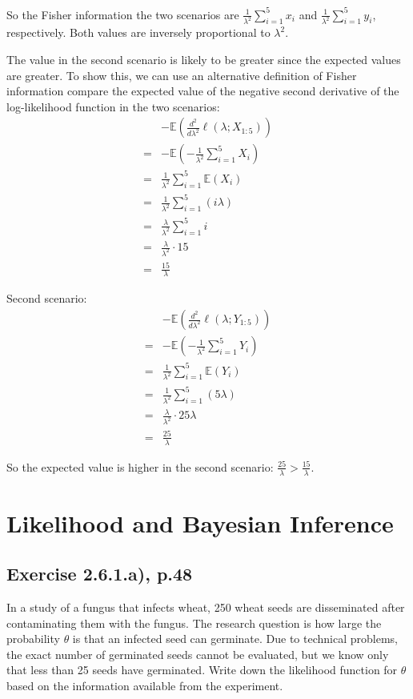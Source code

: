 \documentclass{article}
\begin{document}
\begin{ssolution}
So the Fisher information the two scenarios are
\(\frac{1}{\lambda^2}\sum_{i=1}^5 x_i\)
and
\(\frac{1}{\lambda^2}\sum_{i=1}^5 y_i\),
respectively.
Both values are inversely proportional to \(\lambda^2\).

The value in the second scenario is likely to be greater since the expected values are greater.
To show this, we can
use an alternative definition of Fisher information
compare the expected value of the negative second derivative of the
log-likelihood function in the two scenarios:
\begin{align*}
	& -\mathbb{E}\left(\frac{d^2}{d\lambda^2} \ell(\lambda;X_{1:5})\right) \\
	=& -\mathbb{E}\left(-\frac{1}{\lambda^2}\sum_{i=1}^5 X_i\right) \\
	=& \frac{1}{\lambda^2}\sum_{i=1}^5 \mathbb{E}(X_i) \\
	=& \frac{1}{\lambda^2}\sum_{i=1}^5 (i \lambda) \\
	=& \frac{\lambda}{\lambda^2}\sum_{i=1}^5 i \\
	=& \frac{\lambda}{\lambda^2}\cdot 15 \\
	=& \frac{15}{\lambda}
\end{align*}

Second scenario:
\begin{align*}
	& -\mathbb{E}\left(\frac{d^2}{d\lambda^2} \ell(\lambda;Y_{1:5})\right) \\
	=& -\mathbb{E}\left(-\frac{1}{\lambda^2}\sum_{i=1}^5 Y_i\right) \\
	=& \frac{1}{\lambda^2}\sum_{i=1}^5 \mathbb{E}(Y_i) \\
	=& \frac{1}{\lambda^2}\sum_{i=1}^5 (5\lambda) \\
	=& \frac{\lambda}{\lambda^2}\cdot 25\lambda \\
	=& \frac{25}{\lambda}
\end{align*}

So the expected value is higher in the second scenario:
\(\frac{25}{\lambda} > \frac{15}{\lambda}\).

\end{ssolution}

\section{Likelihood and Bayesian Inference}

\subsection{Exercise 2.6.1.a), p.48}
\begin{sproblem}
In a study of a fungus that infects wheat, 250 wheat seeds are disseminated
after contaminating them with the fungus. The research question is how large
the probability \(\theta\) is that an infected seed can germinate. Due to
technical problems, the exact number of germinated seeds cannot be evaluated,
but we know only that less than 25 seeds have germinated. Write down the
likelihood function for \(\theta\) based on the information available from the
experiment.
\end{sproblem}
\end{document}

